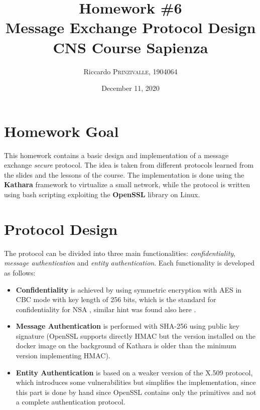 \documentclass{article}
\title{Homework \#6 \\Message Exchange Protocol Design \\[0.2em]\small{}CNS Course Sapienza} %
\author{Riccardo \textsc{Prinzivalle}, 1904064} %
\date{December 11, 2020} %
\begin{document}
\maketitle %


\section{Homework Goal}

This homework contains a basic design and implementation of a message exchange \textit{secure} protocol. The idea is taken from different protocols learned from the slides and the lessons of the course. The implementation is done using the \textbf{Kathara} framework to virtualize a small network, while the protocol is written using bash scripting exploiting the \textbf{OpenSSL} library on Linux.


\section{Protocol Design}
\label{sec:design}

The protocol can be divided into three main functionalities: \textit{confidentiality}, \textit{message authentication} and \textit{entity authentication}. Each functionality is developed as follows:

\begin{itemize}
	\item \textbf{Confidentiality} is achieved by using symmetric encryption with AES in CBC mode with key length of 256 bits, which is the standard for confidentiality for NSA \cite{AES_NSA}, similar hint was found also here \cite{AES_stack}.
	\item \textbf{Message Authentication} is performed with SHA-256 using public key signature (OpenSSL supports directly HMAC but the version installed on the docker image on the background of Kathara is older than the minimum version implementing HMAC).
	\item \textbf{Entity Authentication} is based on a weaker version of the X.509 protocol, which introduces some vulnerabilities but simplifies the implementation, since this part is done by hand since OpenSSL contains only the primitives and not a complete authentication protocol. 
\end{itemize}
\end{document}
